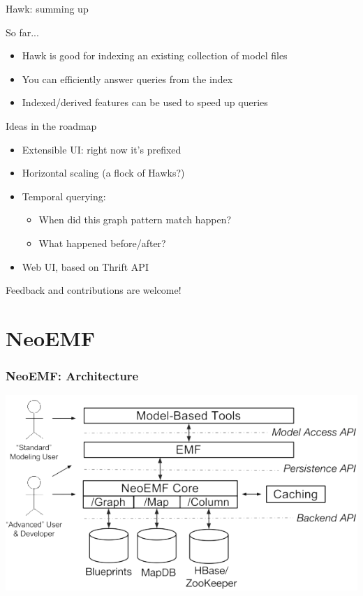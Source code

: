 \documentclass[10pt]{beamer}
\begin{document}
\begin{frame}{Hawk: summing up}

  \begin{block}{So far...}
    \begin{itemize}
    \item Hawk is good for indexing an existing collection of model files
    \item You can efficiently answer queries from the index
    \item Indexed/derived features can be used to speed up queries
    \end{itemize}
  \end{block}

  \begin{block}{Ideas in the roadmap}
    \begin{itemize}
    \item Extensible UI: right now it's prefixed
    \item Horizontal scaling (a flock of Hawks?)
    \item Temporal querying:
      \begin{itemize}
      \item When did this graph pattern match happen?
      \item What happened before/after?
      \end{itemize}
    \item Web UI, based on Thrift API
    \end{itemize}

    Feedback and contributions are welcome!
  \end{block}

\end{frame}

\section{NeoEMF}

\begin{frame}[t]\frametitle{NeoEMF: Architecture}
    \begin{center}
      \includegraphics[width=\textwidth]{neoemf-architecture.png}
    \end{center}
\end{frame}
\end{document}
